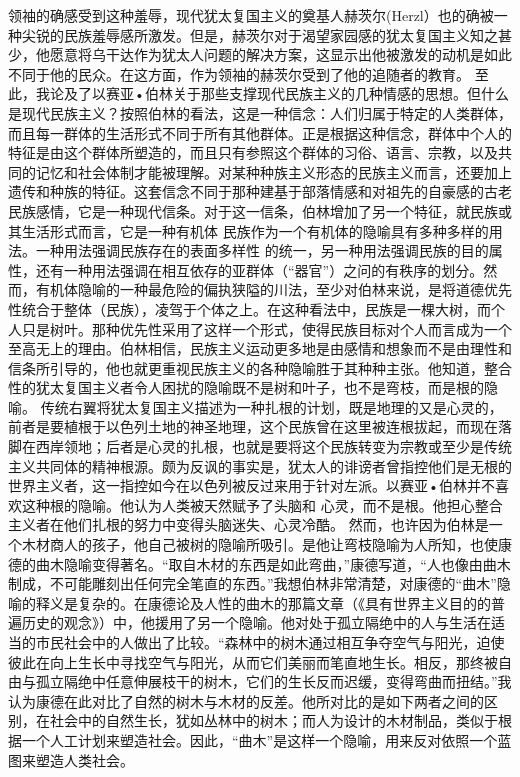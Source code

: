 \documentclass{article}
\begin{document}
\newpage
领袖的确感受到这种羞辱，现代犹太复国主义的奠基人赫茨尔(Herzl）也的确被一种尖锐的民族羞辱感所激发。但是，赫茨尔对于渴望家园感的犹太复国主义知之甚少，他愿意将乌干达作为犹太人问题的解决方案，这显示出他被激发的动机是如此不同于他的民众。在这方面，作为领袖的赫茨尔受到了他的追随者的教育。
     至此，我论及了以赛亚•伯林关于那些支撑现代民族主义的几种情感的思想。但什么是现代民族主义？按照伯林的看法，这是一种信念：人们归属于特定的人类群体，而且每一群体的生活形式不同于所有其他群体。正是根据这种信念，群体中个人的特征是由这个群体所塑造的，而且只有参照这个群体的习俗、语言、宗教，以及共同的记忆和社会体制才能被理解。对某种种族主义形态的民族主义而言，还要加上遗传和种族的特征。这套信念不同于那种建基于部落情感和对祖先的自豪感的古老民族感情，它是一种现代信条。对于这一信条，伯林增加了另一个特征，就民族或其生活形式而言，它是一种有机体
     民族作为一个有机体的隐喻具有多种多样的用法。一种用法强调民族存在的表面多样性
\newpage
的统一，另一种用法强调民族的目的属性，还有一种用法强调在相互依存的亚群体（“器官”）之问的有秩序的划分。然而，有机体隐喻的一种最危险的偏执狭隘的川法，至少对伯林来说，是将道德优先性统合于整体（民族），凌驾于个体之上。在这种看法中，民族是一棵大树，而个人只是树叶。那种优先性采用了这样一个形式，使得民族目标对个人而言成为一个至高无上的理由。伯林相信，民族主义运动更多地是由感情和想象而不是由理性和信条所引导的，他也就更重视民族主义的各种隐喻胜于其种种主张。他知道，整合性的犹太复国主义者令人困扰的隐喻既不是树和叶子，也不是弯枝，而是根的隐喻。
     传统右翼将犹太复国主义描述为一种扎根的计划，既是地理的又是心灵的，前者是要植根于以色列土地的神圣地理，这个民族曾在这里被连根拔起，而现在落脚在西岸领地；后者是心灵的扎根，也就是要将这个民族转变为宗教或至少是传统主义共同体的精神根源。颇为反讽的事实是，犹太人的诽谤者曾指控他们是无根的世界主义者，这一指控如今在以色列被反过来用于针对左派。以赛亚•伯林并不喜欢这种根的隐喻。他认为人类被天然赋予了头脑和
\newpage
心灵，而不是根。他担心整合主义者在他们扎根的努力中变得头脑迷失、心灵冷酷。
     然而，也许因为伯林是一个木材商人的孩子，他自己被树的隐喻所吸引。是他让弯枝隐喻为人所知，也使康德的曲木隐喻变得著名。“取自木材的东西是如此弯曲，”康德写道，“人也像由曲木制成，不可能雕刻出任何完全笔直的东西。”我想伯林非常清楚，对康德的“曲木”隐喻的释义是复杂的。在康德论及人性的曲木的那篇文章（《具有世界主义目的的普遍历史的观念》）中，他援用了另一个隐喻。他对处于孤立隔绝中的人与生活在适当的市民社会中的人做出了比较。“森林中的树木通过相互争夺空气与阳光，迫使彼此在向上生长中寻找空气与阳光，从而它们美丽而笔直地生长。相反，那终被自由与孤立隔绝中任意伸展枝干的树木，它们的生长反而迟缓，变得弯曲而扭结。”我认为康德在此对比了自然的树木与木材的反差。他所对比的是如下两者之间的区别，在社会中的自然生长，犹如丛林中的树木；而人为设计的木材制品，类似于根据一个人工计划来塑造社会。因此，“曲木”是这样一个隐喻，用来反对依照一个蓝图来塑造人类社会。
\newpage
\end{document}
